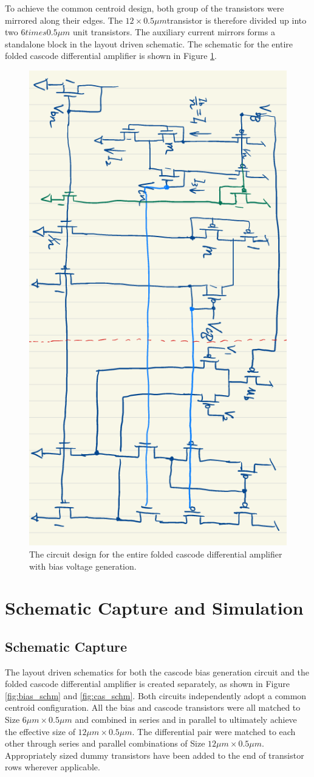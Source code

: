 \documentclass[11pt]{article}
\begin{document}
    To achieve the common centroid design, both group of the transistors were mirrored along their edges. The $12\times0.5\mu m$transistor is therefore divided up into two $6times0.5\mu m$ unit transistors. The auxiliary current mirrors forms a standalone block in the layout driven schematic. The schematic for the entire folded cascode differential amplifier is shown in Figure \ref{fig:schem_all}.

    \begin{figure}[!ht]
        \centering
        \includegraphics[width=.5\linewidth, angle=90]{../img/schem_all.png}
        \caption{The circuit design for the entire folded cascode differential amplifier with bias voltage generation.}
        \label{fig:schem_all}
    \end{figure}



\section{Schematic Capture and Simulation}
    \subsection{Schematic Capture}
    The layout driven schematics for both the cascode bias generation circuit and the folded cascode differential amplifier is created separately, as shown in Figure \ref{fig:bias_schm} and \ref{fig:cas_schm}. Both circuits independently adopt a common centroid configuration. All the bias and cascode transistors were all matched to Size $6\mu m \times 0.5\mu m$ and combined in series and in parallel to ultimately achieve the effective size of $12\mu m \times 0.5\mu m$. The differential pair were matched to each other through series and parallel combinations of Size $12\mu m \times 0.5\mu m$. Appropriately sized dummy transistors have been added to the end of transistor rows wherever applicable.
    
\end{document}
